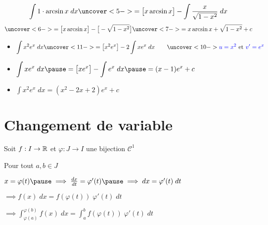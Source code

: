 \begin{frame}
\begin{exemple}


\pause
$$\int 1\cdot \arcsin x \; dx  \uncover<5->{= \big[x\arcsin x\big] - \int \frac{x}{\sqrt{1-x^2}} \; dx}$$
$$\uncover<6->{=  \big[x\arcsin x\big] - \big[-\sqrt {1-x^2}\big]}  \uncover<7->{= x\arcsin x+ \sqrt {1-x^2}+c}$$
\hfil\hfil {}
\end{exemple}

\pause\pause\pause\pause\pause\pause

\begin{exemple}
\pause
\begin{itemize}
  \item $\displaystyle\int x^2e^x \; dx \uncover<11->{= \big[ x^2e^x \big] - 2\int x e^x \; dx }
\qquad \uncover<10->{\textcolor{blue}{u=x^2} \text{ et } \textcolor{blue}{v'=e^x}}$
\pause \pause \pause
  \item $\displaystyle\int x e^x \; dx \pause = \big[x e^x\big] - \int e^x \; dx \pause= (x-1)e^x+c$
\pause
  \item $\displaystyle\int x^2e^x \; dx = (x^2-2x+2) e^x + c$
\end{itemize}
\end{exemple}

\end{frame}




\section*{Changement de variable}

\begin{frame}
\begin{theoreme}
Soit $f : I \to \mathbb{R}$ et $\varphi : J \to I$ une bijection $\mathcal{C}^1$

Pour tout $a,b\in J$ 
\end{theoreme} 

\vfill
\pause

\centerline{$x=\varphi(t) \pause \implies \frac{dx}{dt} = \varphi'(t) \pause \implies dx = \varphi'(t) \; dt$}
\pause
\medskip
\centerline{$\implies f(x) \; dx = f(\varphi(t)) \; \varphi'(t) \; dt$}
\pause
\medskip
\centerline{$\implies \int_{\varphi(a)}^{\varphi(b)} f(x) \; dx = \int_a^b f(\varphi(t)) \; \varphi'(t) \; dt$}

\end{frame}




